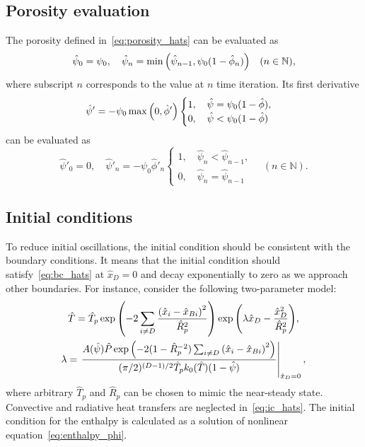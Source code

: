 \documentclass{article}
\newcommand{\Hx}{\hat{x}}
\newcommand{\HT}{\hat{T}}
\newcommand{\HP}{\hat{P}}
\newcommand{\Hphi}{\hat{\phi}}
\newcommand{\Hpsi}{\hat{\psi}}
\newcommand{\HR}{\hat{R}}
\begin{document}

\subsection{Porosity evaluation}

The porosity defined in~\eqref{eq:porosity_hats} can be evaluated as
\begin{equation}\label{eq:porosity_eval}
    \Hpsi_0 = \psi_0, \quad \Hpsi_n = \min\qty(\Hpsi_{n-1}, \psi_0(1-\Hphi_n)) \quad (n\in\mathbb{N}),
\end{equation}
where subscript \(n\) corresponds to the value at \(n\) time iteration.
Its first derivative
\begin{equation}\label{eq:Dporosity}
    \Hpsi' = -\psi_0\max\qty(0, \Hphi') \begin{cases}
        1, \quad \Hpsi = \psi_0(1-\Hphi), \\
        0, \quad \Hpsi < \psi_0(1-\Hphi)
    \end{cases}
\end{equation}
can be evaluated as
\begin{equation}\label{eq:Dporosity_eval}
    \Hpsi'_0 = 0, \quad \Hpsi'_n = -\psi_0\Hphi'_n \begin{cases}
        1, \quad \Hpsi_n < \Hpsi_{n-1}, \\
        0, \quad \Hpsi_n = \Hpsi_{n-1}
    \end{cases}\quad (n\in\mathbb{N}).
\end{equation}

\subsection{Initial conditions}

To reduce initial oscillations, the initial condition should be consistent with the boundary conditions.
It means that the initial condition should satisfy~\eqref{eq:bc_hats} at \(\Hx_D=0\)
and decay exponentially to zero as we approach other boundaries.
For instance, consider the following two-parameter model:
\begin{gather}
    \HT = \HT_p\exp\qty( -2\sum_{i\neq D}\frac{\qty(\Hx_i-\Hx_{Bi})^2}{\HR_p^2} )
        \exp\qty(\lambda \Hx_D - \frac{\Hx_D^2}{\HR_p^2}), \label{eq:ic_hats}\\
    \lambda = \eval{ \frac{A(\Hpsi)\HP\exp\qty( -2(1-\HR_p^{-2})\sum_{i\neq D}\qty(\Hx_i-\Hx_{Bi})^2 )}
        {(\pi/2)^{(D-1)/2}\HT_p k_0(\HT)(1-\Hpsi)} }_{\Hx_D=0}, \label{eq:lambda}
\end{gather}
where arbitrary \(\HT_p\) and \(\HR_p\) can be chosen to mimic the near-steady state.
Convective and radiative heat transfers are neglected in~\eqref{eq:ic_hats}.
The initial condition for the enthalpy is calculated as a solution of nonlinear equation~\eqref{eq:enthalpy_phi}.
\end{document}
